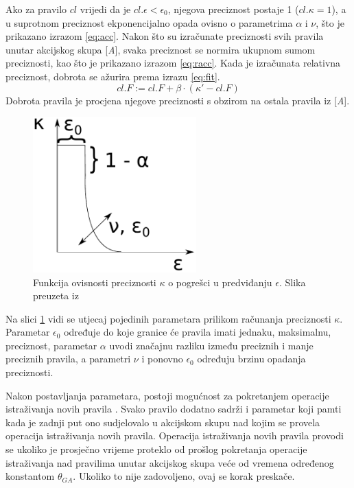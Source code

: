 \documentclass[times, utf8, zavrsni]{fer}
\begin{document}
Ako za pravilo $cl$ vrijedi da je $cl.\epsilon < \epsilon_{0}$, njegova preciznost postaje 1 ($cl.\kappa = 1$), a u suprotnom preciznost ekponencijalno opada ovisno o parametrima $\alpha$ i $\nu$, što je prikazano izrazom \eqref{eq:acc}.
Nakon što su izračunate preciznosti svih pravila unutar akcijskog skupa [\emph{A}], svaka preciznost se normira ukupnom sumom preciznosti, kao što je prikazano izrazom \eqref{eq:racc}.
Kada je izračunata relativna preciznost, dobrota se ažurira prema izrazu \eqref{eq:fit}.
\begin{equation}
    \label{eq:fit}
    cl.F := cl.F + \beta \cdot (\kappa' - cl.F)
\end{equation}
Dobrota pravila je procjena njegove preciznosti s obzirom na ostala pravila iz [\emph{A}].
\begin{figure}[h]
    \centering
    \includegraphics[height=6cm]{img/fit.pdf}
    \caption{Funkcija ovisnosti preciznosti $\kappa$ o pogrešci u predviđanju $\epsilon$. Slika preuzeta iz \citep{5}}
    \label{img:fit}
\end{figure}
Na slici \ref{img:fit} vidi se utjecaj pojedinih parametara prilikom računanja preciznosti $\kappa$.
Parametar $\epsilon_{0}$ određuje do koje granice će pravila imati jednaku, maksimalnu, preciznost, parametar $\alpha$ uvodi značajnu razliku između preciznih i manje preciznih pravila, a parametri $\nu$ i ponovno $\epsilon_{0}$ određuju brzinu opadanja preciznosti.

Nakon postavljanja parametara, postoji mogućnost za pokretanjem operacije istraživanja novih pravila .
Svako pravilo dodatno sadrži i parametar koji pamti kada je zadnji put ono sudjelovalo u akcijskom skupu nad kojim se provela operacija istraživanja novih pravila.
Operacija istraživanja novih pravila provodi se ukoliko je prosječno vrijeme proteklo od prošlog pokretanja operacije istraživanja nad pravilima unutar akcijskog skupa veće od vremena određenog konstantom $\theta_{GA}$.
Ukoliko to nije zadovoljeno, ovaj se korak preskače.
\end{document}
